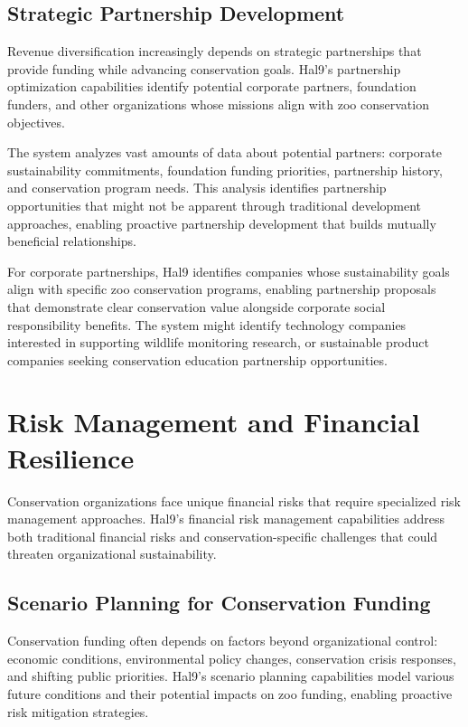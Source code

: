 \documentclass[
  Letterpaper,
]{scrbook}
\begin{document}
\subsection{Strategic Partnership
Development}\label{strategic-partnership-development}

Revenue diversification increasingly depends on strategic partnerships
that provide funding while advancing conservation goals. Hal9's
partnership optimization capabilities identify potential corporate
partners, foundation funders, and other organizations whose missions
align with zoo conservation objectives.

The system analyzes vast amounts of data about potential partners:
corporate sustainability commitments, foundation funding priorities,
partnership history, and conservation program needs. This analysis
identifies partnership opportunities that might not be apparent through
traditional development approaches, enabling proactive partnership
development that builds mutually beneficial relationships.

For corporate partnerships, Hal9 identifies companies whose
sustainability goals align with specific zoo conservation programs,
enabling partnership proposals that demonstrate clear conservation value
alongside corporate social responsibility benefits. The system might
identify technology companies interested in supporting wildlife
monitoring research, or sustainable product companies seeking
conservation education partnership opportunities.

\section{Risk Management and Financial
Resilience}\label{risk-management-and-financial-resilience}

Conservation organizations face unique financial risks that require
specialized risk management approaches. Hal9's financial risk management
capabilities address both traditional financial risks and
conservation-specific challenges that could threaten organizational
sustainability.

\subsection{Scenario Planning for Conservation
Funding}\label{scenario-planning-for-conservation-funding}

Conservation funding often depends on factors beyond organizational
control: economic conditions, environmental policy changes, conservation
crisis responses, and shifting public priorities. Hal9's scenario
planning capabilities model various future conditions and their
potential impacts on zoo funding, enabling proactive risk mitigation
strategies.
\end{document}
